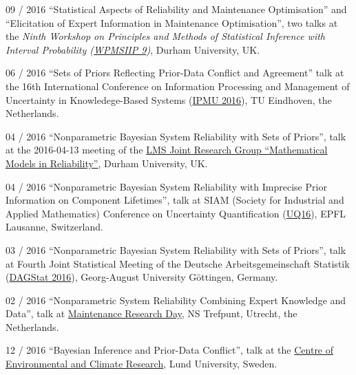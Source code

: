 \documentclass[a4paper]{simplecv}
\begin{document}
\begin{topic}
\item[09 / 2016] ``Statistical Aspects of Reliability and Maintenance Optimisation'' and
                 ``Elicitation of Expert Information in Maintenance Optimisation'', two talks at the %
                 \emph{Ninth Workshop on Principles and Methods of Statistical Inference with Interval Probability (\href{http://www.maths.dur.ac.uk/users/matthias.troffaes/wpmsiip2016/index.html}{WPMSIIP 9})}, Durham University, UK.

\item[06 / 2016] ``Sets of Priors Reflecting Prior-Data Conflict and Agreement'' talk at %
                 the 16th International Conference on Information Processing and Management of Uncertainty in Knowledege-Based Systems
                 (\href{http://ipmu2016.org/}{IPMU 2016}), TU Eindhoven, the Netherlands.

\item[04 / 2016] ``Nonparametric Bayesian System Reliability with Sets of Priors'', talk at the %
                 2016-04-13 meeting of the \href{http://maths.dur.ac.uk/stats/people/fc/LMS-Reliability.html}{LMS Joint Research Group ``Mathematical Models in Reliability''}, Durham University, UK.

\item[04 / 2016] ``Nonparametric Bayesian System Reliability with Imprecise Prior Information on Component Lifetimes'', talk at %
                 SIAM (Society for Industrial and Applied Mathematics) Conference on Uncertainty Quantification
                 (\href{http://www.siam.org/meetings/uq16/index.php}{UQ16}),
                 EPFL Lausanne, Switzerland.

\item[03 / 2016] ``Nonparametric Bayesian System Reliability with Sets of Priors'', talk at %
                 Fourth Joint Statistical Meeting of the Deutsche Arbeitsgemeinschaft Statistik
                 (\href{http://www.uni-goettingen.de/dagstat2016}{DAGStat 2016}),
                 Georg-August University G\"{o}ttingen, Germany.

\item[02 / 2016] ``Nonparametric System Reliability Combining Expert Knowledge and Data'', talk at %
                 \href{http://www.maintenanceresearch.nl/}{Maintenance Research Day}, NS Trefpunt, Utrecht, the Netherlands.

\item[12 / 2016] ``Bayesian Inference and Prior-Data Conflict'', talk at %
                 the \href{http://www.cec.lu.se/}{Centre of Environmental and Climate Research},
                 Lund University, Sweden.


\end{topic}
\end{document}
